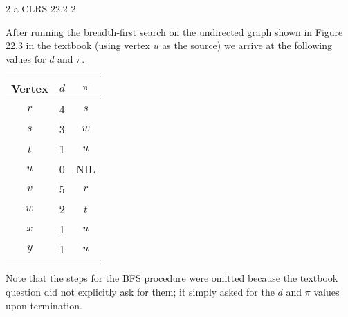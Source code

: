 \documentclass[11pt]{article}
\begin{document}
\begin{prob}{2-a}
CLRS 22.2-2
\end{prob}
\begin{sol} 

After running the breadth-first search on the undirected graph shown in Figure 22.3 in the textbook (using vertex $u$ as the source) we arrive at the following values for $d$ and $\pi$.

\begin{center}
  \begin{tabular}{| c | c  c |}
    \hline
	Vertex & $d$ & $\pi$ \\ \hline
	$r$ & 4 & $s$ \\
	$s$ & 3 & $w$ \\
	$t$ & 1 & $u$ \\
	$u$ & 0 & NIL\\ 
	$v$ & 5 & $r$\\ 
	$w$ & 2 & $t$\\
	$x$ & 1 & $u$\\
	$y$ & 1 & $u$\\ \hline
  \end{tabular}
\end{center}

Note that the steps for the BFS procedure were omitted because the textbook question did not explicitly ask for them; it simply asked for the $d$ and $\pi$ values upon termination.

\end{sol}
\end{document}
